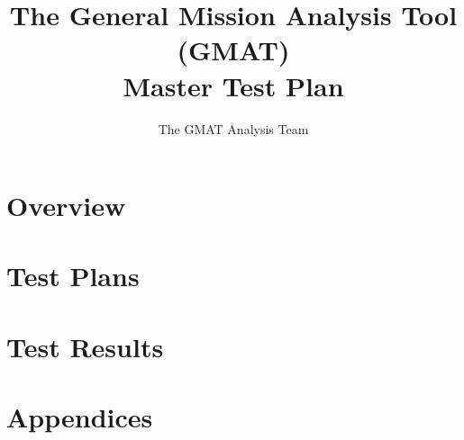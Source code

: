\documentclass[letterpaper,10pt]{book}
\title{The General Mission Analysis Tool (GMAT)\\Master Test Plan}
\author{The GMAT Analysis Team}
\begin{document}
\newcommand\chapauthor[1]{\emph{#1}}

\begin{titlepage}
\maketitle
\end{titlepage}
\thispagestyle{empty}

\tableofcontents
\clearpage
\listoffigures
\clearpage
\listoftables

\part{Overview}
\thispagestyle{empty}







\part{Test Plans}
\thispagestyle{empty}









\part{Test Results}
\thispagestyle{empty}









\appendix
\part{Appendices}



\backmatter
\end{document}
